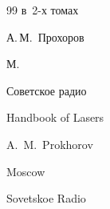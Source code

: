 \begin{thebibliography}{99}
\bookinfo в~2-х томах


\ed А.\,М.~Прохоров

\publaddr М.

\publ Советское радио



\misctransl

\book Handbook of Lasers

\ed A.~M.~Prokhorov

\publaddr Moscow

\publ Sovetskoe Radio






\end{thebibliography}







\noindent

\hskip6.5cm \thedate \par\noindent

\hskip6.5cm\therevdate










\makeengtitlem



\newpage



%

